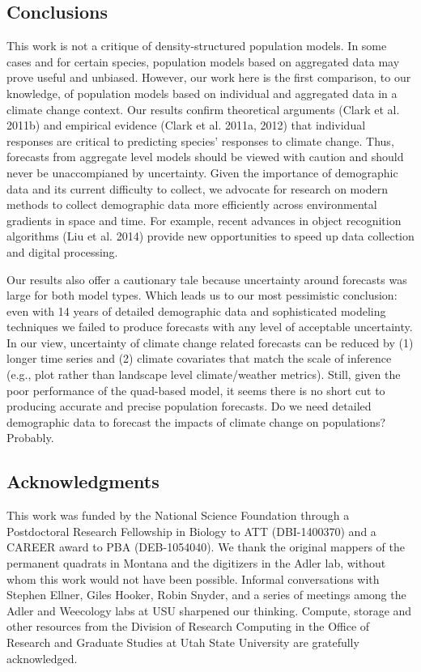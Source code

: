 \documentclass[12pt,]{article}
\begin{document}
\subsection{Conclusions}\label{conclusions}

This work is not a critique of density-structured population models. In
some cases and for certain species, population models based on
aggregated data may prove useful and unbiased. However, our work here is
the first comparison, to our knowledge, of population models based on
individual and aggregated data in a climate change context. Our results
confirm theoretical arguments (Clark et al. 2011b) and empirical
evidence (Clark et al. 2011a, 2012) that individual responses are
critical to predicting species' responses to climate change. Thus,
forecasts from aggregate level models should be viewed with caution and
should never be unaccompianed by uncertainty. Given the importance of
demographic data and its current difficulty to collect, we advocate for
research on modern methods to collect demographic data more efficiently
across environmental gradients in space and time. For example, recent
advances in object recognition algorithms (Liu et al. 2014) provide new
opportunities to speed up data collection and digital processing.

Our results also offer a cautionary tale because uncertainty around
forecasts was large for both model types. Which leads us to our most
pessimistic conclusion: even with 14 years of detailed demographic data
and sophisticated modeling techniques we failed to produce forecasts
with any level of acceptable uncertainty. In our view, uncertainty of
climate change related forecasts can be reduced by (1) longer time
series and (2) climate covariates that match the scale of inference
(e.g., plot rather than landscape level climate/weather metrics). Still,
given the poor performance of the quad-based model, it seems there is no
short cut to producing accurate and precise population forecasts. Do we
need detailed demographic data to forecast the impacts of climate change
on populations? Probably.

\subsection{Acknowledgments}\label{acknowledgments}

This work was funded by the National Science Foundation through a
Postdoctoral Research Fellowship in Biology to ATT (DBI-1400370) and a
CAREER award to PBA (DEB-1054040). We thank the original mappers of the
permanent quadrats in Montana and the digitizers in the Adler lab,
without whom this work would not have been possible. Informal
conversations with Stephen Ellner, Giles Hooker, Robin Snyder, and a
series of meetings among the Adler and Weecology labs at USU sharpened
our thinking. Compute, storage and other resources from the Division of
Research Computing in the Office of Research and Graduate Studies at
Utah State University are gratefully acknowledged.
\end{document}
